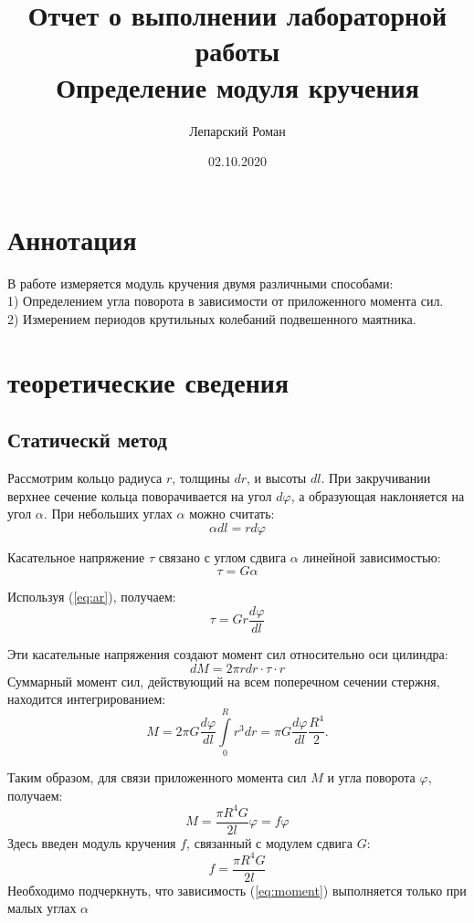\documentclass[a4paper, 12pt]{article}
\title{Отчет о выполнении лабораторной работы \\ Определение модуля кручения}
\author{Лепарский Роман}
\date{02.10.2020}
\begin{document}
\maketitle

\newpage

\section{Аннотация}

В работе измеряется модуль кручения двумя различными способами:\\
1) Определением угла поворота в зависимости от приложенного момента сил.\\
2) Измерением периодов крутильных колебаний подвешенного маятника.

\section{теоретические сведения}

\subsection{Статическй метод}

Рассмотрим кольцо радиуса $r$, толщины $dr$, и высоты $dl$.
При закручивании верхнее сечение кольца поворачивается на угол $d\varphi$, а образующая наклоняется на угол $\alpha$.
При небольших углах $\alpha$ можно считать:
\begin{equation} \label{eq:ar}
\alpha dl = rd\varphi
\end{equation}

Касательное напряжение $\tau$ связано с углом сдвига $\alpha$ линейной зависимостью:
\[
\tau = G\alpha
\]

Используя (\ref{eq:ar}), получаем:
\[
\tau = Gr\frac{d\varphi}{dl}
\]

Эти касательные напряжения создают момент сил относительно оси цилиндра:
\[
dM = 2\pi rdr \cdot \tau \cdot r
\]
Суммарный момент сил, действующий на всем поперечном сечении стержня, находится интегрированием:
\[
M = 2\pi G\frac{d\varphi}{dl} \int\limits_0^R r^3dr = \pi G\frac{d\varphi}{dl} \frac{R^4}{2} \text{.}
\]

Таким образом, для связи приложенного момента сил $M$ и угла поворота $\varphi$, получаем:
\begin{equation} \label{eq:moment}
M = \frac{\pi R^4 G}{2l} \varphi = f\varphi
\end{equation}
Здесь введен модуль кручения $f$, связанный с модулем сдвига $G$:
\begin{equation} \label{eq:fG}
f = \frac{\pi R^4 G}{2l}
\end{equation}
Необходимо подчеркнуть, что зависимость (\ref{eq:moment}) выполняется только при малых углах $\alpha$
\end{document}
